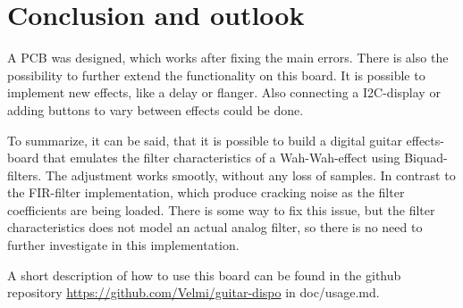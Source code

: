 \section{Conclusion and outlook}

A \ac{PCB} was designed, which works after fixing the main errors. There is also the possibility to further
extend the functionality on this board. It is possible to implement new effects, like a delay or flanger.
Also connecting a \ac{I2C}-display or adding buttons to vary between effects could be done.

To summarize, it can be said, that it is possible to build a digital guitar effects-board that emulates
the filter characteristics of a Wah-Wah-effect using Biquad-filters. The adjustment works smootly, without
any loss of samples. In contrast to the \ac{FIR}-filter implementation, which produce cracking noise
as the filter coefficients are being loaded. There is some way to fix this issue, but the filter characteristics
does not model an actual analog filter, so there is no need to further investigate in this implementation.

A short description of how to use this board can be found in the github repository
\url{https://github.com/Velmi/guitar-dispo} in doc/usage.md.

